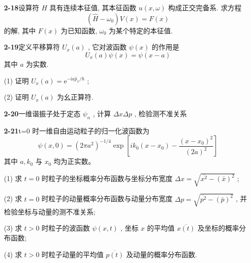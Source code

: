 \vfill

\newpage

\textbf{2-18}\quad 设算符 $\displaystyle \hat{H}$ 具有连续本征值, 其本征函数 $\displaystyle u(x, \omega)$ 构成正交完备系. 求方程
\begin{equation}
(\hat{H} - \omega_{0}) V(x) = F(x)\tag{1}
\end{equation}
的解, 其中 $\displaystyle F(x)$ 为已知函数, $\displaystyle \omega_0$ 为某个特定的本征值.

\vfill

\newpage

\textbf{2-19}\quad 定义平移算符 $\displaystyle U_{x}(a)$ , 它对波函数 $\displaystyle \psi(x)$ 的作用是
$$
U _ {x} (a) \psi (x) = \psi (x - a)
$$
其中 $\displaystyle a$ 为实数.

(1) 证明 $\displaystyle U_x(a) = \mathrm{e}^{-\mathrm{i}a\hat{p}_x / \hbar}$ ;

(2) 证明 $\displaystyle U_x(a)$ 为幺正算符.

\vfill

\newpage

\textbf{2-20}\quad 一维谐振子处于定态 $\displaystyle \psi_{n}$ , 计算 $\displaystyle \Delta x\Delta p$ , 检验测不准关系

\vfill

\newpage

\textbf{2-21}\quad t=0 时一维自由运动粒子的归一化波函数为
\begin{equation}
\psi (x, 0) = \left(2 \pi a ^ {2}\right) ^ {- 1 / 4} \exp \left[ i k _ {0} \left(x - x _ {0}\right) - \dfrac {\left(x - x _ {0}\right) ^ {2}}{(2 a) ^ {2}} \right]
\end{equation}
其中 $\displaystyle a, k_0$ 与 $\displaystyle x_0$ 均为正实数。

(1) 求 $\displaystyle t = 0$ 时粒子的坐标概率分布函数与坐标分布宽度 $\displaystyle \Delta x = \sqrt{\overline{x^2} - (\bar{x})^2}$ ;

(2) 求 $\displaystyle t = 0$ 时粒子的动量概率分布函数与动量分布宽度 $\displaystyle \Delta p = \sqrt{\overline{p^2} - (\bar{p})^2}$ , 并检验坐标与动量的测不准关系;

(3) 求 $\displaystyle t > 0$ 时粒子的波函数 $\displaystyle \psi(x, t)$ , 坐标 $\displaystyle x$ 的平均值 $\displaystyle \overline{x(t)}$ 及坐标的概率分布函数;

(4) 求 $\displaystyle t > 0$ 时粒子动量的平均值 $\displaystyle \overline{p(t)}$ 及动量的概率分布函数.

\vfill

\newpage

